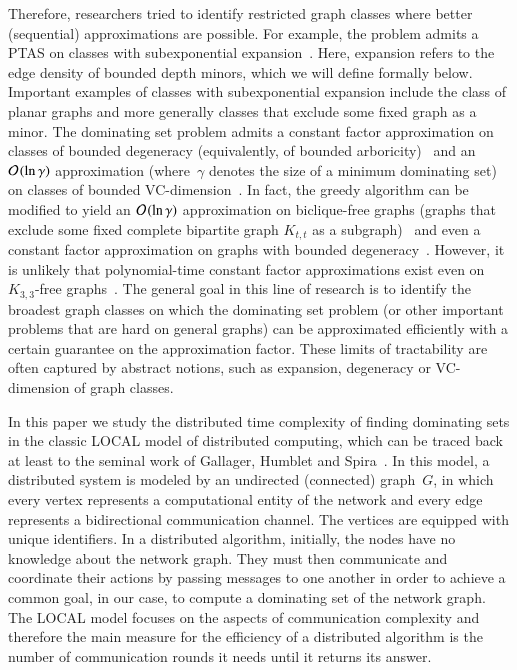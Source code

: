 Therefore, researchers tried to identify restricted
graph classes where better (sequential) approximations are possible.
For example, the problem
admits a PTAS on classes with sub\-exponential expansion~\cite{har2017approximation}. Here, expansion refers to the edge
density of bounded depth minors, which we will define formally
below. Important examples of classes with subexponential
expansion include the class of planar graphs and more generally
classes that exclude some fixed graph as a minor. The dominating
set problem admits a constant factor approximation on classes of
bounded degeneracy (equivalently, of bounded arboricity)~\cite{bansal2017tight,lenzen2010minimum}
and an $\mathcal{O}\hspace{1pt}(\ln \gamma)$ approxi\-mation (where~$\gamma$ denotes the size
of a minimum dominating set) on classes of bounded VC-dimension~\cite{bronnimann1995almost,even2005hitting}. In fact, the greedy
algorithm can be modified to yield an $\mathcal{O}\hspace{1pt}(\ln \gamma)$
approximation on biclique-free graphs (graphs that exclude some fixed
complete bipartite graph $K_{t,t}$ as a subgraph)~\cite{siebertz2019greedy}
and even a constant factor approximation on
graphs with bounded degeneracy~\cite{jones2017parameterized}.
However, it is unlikely
that polynomial-time constant factor approximations exist even on
$K_{3,3}$-free graphs~\cite{siebertz2019greedy}.
The general goal in this line of research is to identify the broadest
graph classes on which the dominating set problem (or other important
problems that are hard on general graphs) can be approximated
efficiently with a certain guarantee on the approximation factor.
These limits of tractability are often captured by abstract notions, such
as expansion, degeneracy or VC-dimension of graph classes.

\medskip
In this paper we study the distributed time complexity of finding
dominating sets in the classic LOCAL model of distributed computing,
which can be traced back at least to the seminal work of Gallager,
Humblet and Spira~\cite{gallager1983distributed}. In this model, a
distributed system is modeled by an undirected (connected) graph~$G$,
in which every vertex represents a computational entity of the network and every edge represents a bidirectional communication channel. The vertices are equipped with unique identifiers.
In a distributed algorithm, initially, the nodes have no knowledge about
the network graph. They must then communicate and coordinate
their actions by passing messages to one another in order to achieve
a common goal, in our case, to compute a dominating set of the
network graph. The LOCAL model focuses on the aspects of
communication complexity and therefore the main measure for
the efficiency of a distributed algorithm is the number of communication
rounds it needs until it returns its answer.

